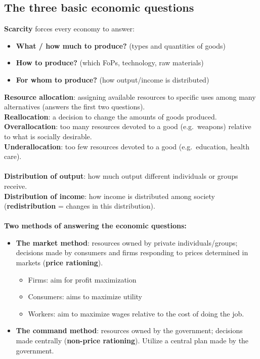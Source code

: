 \documentclass[a4paper,12pt]{article}
\begin{document}
\subsection{The three basic economic questions}
\textbf{Scarcity} forces every economy to answer:
\begin{itemize}
  \item \textbf{What / how much to produce?} (types and quantities of goods)
  \item \textbf{How to produce?} (which FoPs, technology, raw materials)
  \item \textbf{For whom to produce?} (how output/income is distributed)
\end{itemize}
\textbf{Resource allocation}: assigning available resources to specific uses among many alternatives (answers the first two questions).\\
\textbf{Reallocation}: a decision to change the amounts of goods produced.\\
\textbf{Overallocation}: too many resources devoted to a good (e.g.\ weapons) relative to what is socially desirable.\\
\textbf{Underallocation}: too few resources devoted to a good (e.g.\ education, health care).\\\\
\textbf{Distribution of output}: how much output different individuals or groups receive.\\
\textbf{Distribution of income}: how income is distributed among society (\textbf{redistribution} = changes in this distribution).\\\\
\textbf{Two methods of answering the economic questions:}
\begin{itemize}
  \item \textbf{The market method}: resources owned by private individuals/groups; decisions made by consumers and firms responding to prices determined in markets (\textbf{price rationing}).
	\begin{itemize}
		\item Firms: aim for profit maximization
		\item Consumers: aims to maximize utility
		\item Workers: aim to maximize wages relative to the cost of doing the job.
	\end{itemize}
  \item \textbf{The command method}: resources owned by the government; decisions made centrally (\textbf{non-price rationing}). Utilize a central plan made by the government.
\end{itemize}
\end{document}
